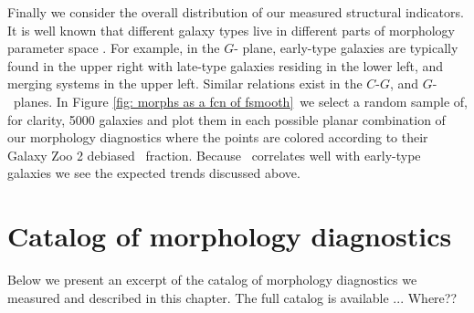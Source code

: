 
Finally we consider the overall distribution of our measured structural indicators. It is well known that different galaxy types live in different parts of morphology parameter space \citep{Abraham1996,Abraham2003,Conselice2000,Lotz2004,Lotz2008}. For example, in the $G$- plane, early-type galaxies are typically found in the upper right with late-type galaxies residing in the lower left, and merging systems in the upper left. Similar relations exist in the $C$-$G$, and $G$-~planes. In Figure \ref{fig: morphs as a fcn of fsmooth}~we select a random sample of, for clarity, 5000 galaxies and plot them in each possible planar combination of our morphology diagnostics where the points are colored according to their Galaxy Zoo 2 debiased \fsmooth~fraction. Because \fsmooth~correlates well with early-type galaxies we see the expected trends discussed above. 



\section{Catalog of morphology diagnostics}
Below we present an excerpt of the catalog of morphology diagnostics we measured and described in this chapter. The full catalog is available ... Where??


\label{tab: morphologies}


